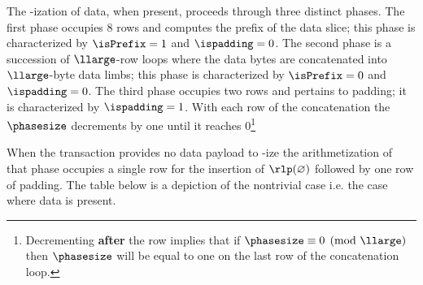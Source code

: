 The \rlp{}-ization of data, when present, proceeds through three distinct phases.
The first phase occupies 8 rows and computes the \rlp{} prefix of the data slice; this phase is characterized by $\isPrefix=1$ and $\ispadding=0$.
The second phase is a succession of $\llarge$-row loops where the data bytes are concatenated into $\llarge$-byte data limbs; this phase is characterized by $\isPrefix=0$ and $\ispadding=0$.
The third phase occupies two rows and pertains to padding; it is characterized by $\ispadding=1$.
With each row of the concatenation the $\phasesize$ decrements by one until it reaches $0$\footnote{Decrementing \textbf{after} the row implies that if $\phasesize \equiv 0 \pmod{\llarge}$ then $\phasesize$ will be equal to one on the last row of the concatenation loop.}

When the transaction provides no data payload to \rlp{}-ize the arithmetization of that phase occupies a single row for the insertion of $\rlp(\varnothing)$ followed by one row of padding.
The table below is a depiction of the nontrivial case i.e. the case where data is present.
